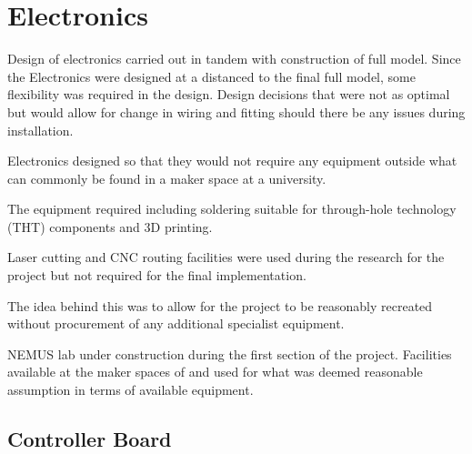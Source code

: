 


\section{Electronics}\label{electronics}

Design of electronics carried out in tandem with construction of full
model. Since the Electronics were designed at a distanced to the final
full model, some flexibility was required in the design. Design decisions
that were not as optimal but would allow for change in wiring and
fitting should there be any issues during installation.

Electronics designed so that they would not require any equipment
outside what can commonly be found in a maker space at a university.

The equipment required including soldering suitable for through-hole
technology (THT) components and 3D printing.

Laser cutting and CNC routing facilities were used during the research
for the project but not required for the final implementation.

The idea behind this was to allow for the project to be reasonably
recreated without procurement of any additional specialist equipment.

NEMUS lab under construction during the first section of the project.
Facilities available at the maker spaces of  and
 used for what was deemed reasonable assumption in
terms of available equipment.


\subsection{Controller Board}\label{controller-board}

